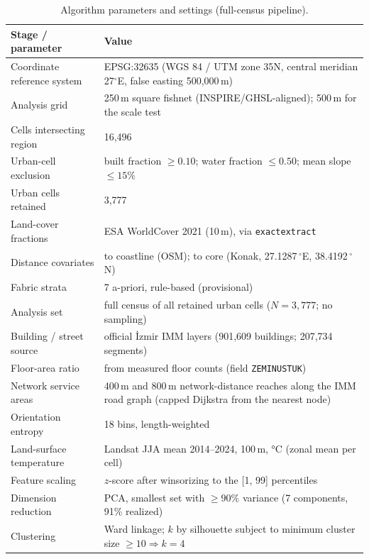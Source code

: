 \begin{table}[htbp]
  \centering\footnotesize
  \begin{singlespace}
  \caption{Algorithm parameters and settings (full-census pipeline).}\label{tab:params}
  \begin{tabular}{@{}p{}p{}@{}}
  \toprule
  Stage / parameter & Value \\
  \midrule
  Coordinate reference system & EPSG:32635 (WGS 84 / UTM zone 35N, central meridian 27$^\circ$E, false easting 500{,}000\,m) \\
  Analysis grid             & 250\,m square fishnet (INSPIRE/GHSL-aligned); 500\,m for the scale test \\
  Cells intersecting region & 16{,}496 \\
  Urban-cell exclusion      & built fraction $\ge 0.10$; water fraction $\le 0.50$; mean slope $\le 15\%$ \\
  Urban cells retained      & 3{,}777 \\
  Land-cover fractions      & ESA WorldCover 2021 (10\,m), via \texttt{exactextract} \\
  Distance covariates       & to coastline (OSM); to core (Konak, 27.1287\,$^\circ$E, 38.4192\,$^\circ$N) \\
  Fabric strata             & 7 a-priori, rule-based (provisional) \\
  Analysis set              & full census of all retained urban cells ($N=3{,}777$; no sampling) \\
  Building / street source  & official \.{I}zmir IMM layers (901{,}609 buildings; 207{,}734 segments) \\
  Floor-area ratio          & from measured floor counts (field \texttt{ZEMINUSTUK}) \\
  Network service areas     & 400\,m and 800\,m network-distance reaches along the IMM road graph (capped Dijkstra from the nearest node) \\
  Orientation entropy       & 18 bins, length-weighted \\
  Land-surface temperature  & Landsat JJA mean 2014--2024, 100\,m, \si{\celsius} (zonal mean per cell) \\
  Feature scaling           & $z$-score after winsorizing to the [1, 99] percentiles \\
  Dimension reduction       & PCA, smallest set with $\ge 90\%$ variance (7 components, 91\% realized) \\
  Clustering                & Ward linkage; $k$ by silhouette subject to minimum cluster size $\ge 10 \Rightarrow k=4$ \\

\end{tabular}
\end{singlespace}
\end{table}

